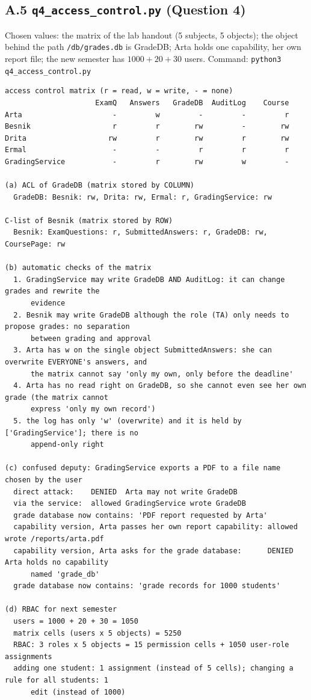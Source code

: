 \documentclass[11pt,a4paper]{article}
\begin{document}
\subsection*{A.5 \texttt{q4\_access\_control.py} (Question 4)}
Chosen values: the matrix of the lab handout (5 subjects, 5 objects); the object behind the path
\texttt{/db/grades.db} is GradeDB; Arta holds one capability, her own report file; the new semester has
$1000+20+30$ users. Command: \texttt{python3 q4\_access\_control.py}
\begin{Verbatim}[fontsize=\footnotesize, frame=single]
access control matrix (r = read, w = write, - = none)
                     ExamQ   Answers   GradeDB  AuditLog    Course
Arta                     -         w         -         -         r
Besnik                   r         r        rw         -        rw
Drita                   rw         r        rw         r        rw
Ermal                    -         -         r         r         r
GradingService           -         r        rw         w         -

(a) ACL of GradeDB (matrix stored by COLUMN)
  GradeDB: Besnik: rw, Drita: rw, Ermal: r, GradingService: rw

C-list of Besnik (matrix stored by ROW)
  Besnik: ExamQuestions: r, SubmittedAnswers: r, GradeDB: rw, CoursePage: rw

(b) automatic checks of the matrix
  1. GradingService may write GradeDB AND AuditLog: it can change grades and rewrite the
      evidence
  2. Besnik may write GradeDB although the role (TA) only needs to propose grades: no separation
      between grading and approval
  3. Arta has w on the single object SubmittedAnswers: she can overwrite EVERYONE's answers, and
      the matrix cannot say 'only my own, only before the deadline'
  4. Arta has no read right on GradeDB, so she cannot even see her own grade (the matrix cannot
      express 'only my own record')
  5. the log has only 'w' (overwrite) and it is held by ['GradingService']; there is no
      append-only right

(c) confused deputy: GradingService exports a PDF to a file name chosen by the user
  direct attack:    DENIED  Arta may not write GradeDB
  via the service:  allowed GradingService wrote GradeDB
  grade database now contains: 'PDF report requested by Arta'
  capability version, Arta passes her own report capability: allowed wrote /reports/arta.pdf
  capability version, Arta asks for the grade database:      DENIED  Arta holds no capability
      named 'grade_db'
  grade database now contains: 'grade records for 1000 students'

(d) RBAC for next semester
  users = 1000 + 20 + 30 = 1050
  matrix cells (users x 5 objects) = 5250
  RBAC: 3 roles x 5 objects = 15 permission cells + 1050 user-role assignments
  adding one student: 1 assignment (instead of 5 cells); changing a rule for all students: 1
      edit (instead of 1000)
\end{Verbatim}
\end{document}

